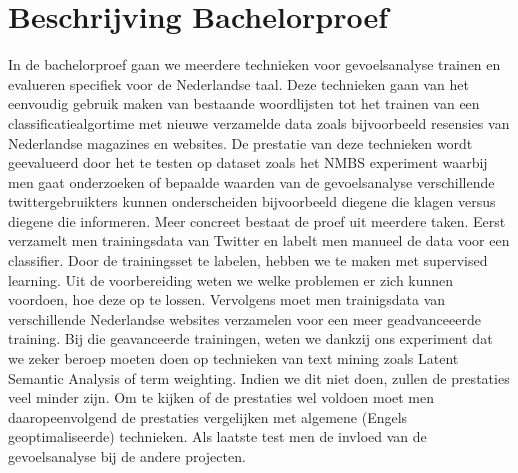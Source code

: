 \chapter{Beschrijving Bachelorproef}\label{Beschrijving Bachelorproef}

In de bachelorproef gaan we meerdere technieken voor gevoelsanalyse trainen en evalueren specifiek voor de Nederlandse taal. Deze technieken gaan van het eenvoudig gebruik maken van bestaande woordlijsten tot het trainen van een classificatiealgortime met nieuwe verzamelde data zoals bijvoorbeeld resensies van Nederlandse magazines en websites. De prestatie van deze technieken wordt geevalueerd door het te testen op dataset zoals het NMBS experiment waarbij men gaat onderzoeken of bepaalde waarden van de gevoelsanalyse verschillende twittergebruikters kunnen onderscheiden bijvoorbeeld diegene die klagen versus diegene die informeren. Meer concreet bestaat de proef uit meerdere taken. Eerst verzamelt men trainingsdata van Twitter en labelt men manueel de data voor een classifier. Door de trainingsset te labelen, hebben we te maken met supervised learning. Uit de voorbereiding weten we welke problemen er zich kunnen voordoen, hoe deze op te lossen. Vervolgens moet men trainigsdata van verschillende Nederlandse websites verzamelen voor een meer geadvanceeerde training. Bij die geavanceerde trainingen, weten we dankzij ons experiment dat we zeker beroep moeten doen op technieken van text mining zoals Latent Semantic Analysis of term weighting. Indien we dit niet doen, zullen de prestaties veel minder zijn. Om te kijken of de prestaties wel voldoen moet men daaropeenvolgend de prestaties vergelijken met algemene (Engels geoptimaliseerde) technieken. Als laatste test men de invloed van de gevoelsanalyse bij de andere projecten. 
    
